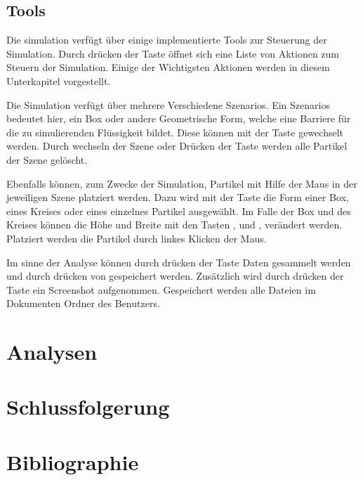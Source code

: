 \documentclass[a4paper, 12pt]{article}
\begin{document}
\subsection{Tools}
Die simulation verfügt über einige implementierte Tools zur Steuerung der Simulation. Durch drücken der Taste  öffnet sich eine Liste von Aktionen zum Steuern der Simulation. Einige der Wichtigsten Aktionen werden in diesem Unterkapitel vorgestellt. 

Die Simulation verfügt über mehrere Verschiedene \glqq Szenarios\grqq{}. Ein \glqq Szenarios\grqq{} bedeutet hier, ein Box oder andere Geometrische Form, welche eine Barriere für die zu simulierenden Flüssigkeit bildet. Diese können mit der Taste  gewechselt werden. Durch wechseln der Szene oder Drücken der Taste  werden alle Partikel der Szene gelöscht. 

Ebenfalls können, zum Zwecke der Simulation, Partikel mit Hilfe der Maus in der jeweiligen Szene platziert werden. Dazu wird mit der Taste  die Form einer Box, eines Kreises oder eines einzelnes Partikel
ausgewählt. Im Falle der Box und des Kreises können die Höhe und Breite mit den Tasten ,  und ,  verändert werden. Platziert werden die Partikel durch linkes Klicken der Maus.

Im sinne der Analyse können durch drücken der Taste  Daten gesammelt werden und durch drücken von  gespeichert werden. Zusätzlich wird durch drücken der Taste  ein Screenshot aufgenommen. Gespeichert werden alle Dateien im Dokumenten Ordner des Benutzers.

\section{Analysen} \label{section_6}


\section{Schlussfolgerung}

\section{Bibliographie}
\end{document}
